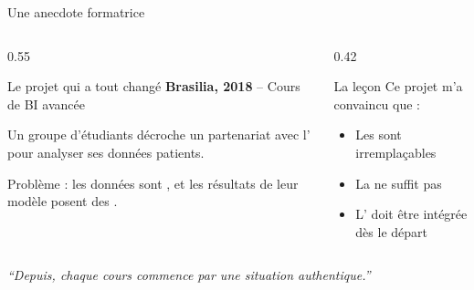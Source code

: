 \documentclass[aspectratio=169,11pt]{beamer}
\begin{document}
\begin{frame}{Une anecdote formatrice}
  \begin{columns}[T]
    \begin{column}{0.55\textwidth}
      \begin{block}{Le projet qui a tout changé}
        \textbf{Brasilia, 2018} -- Cours de BI avancée
        
        \vspace{0.5em}
        Un groupe d'étudiants décroche un partenariat avec l' pour analyser ses données patients.
        
        \vspace{0.5em}
        Problème : les données sont , et les résultats de leur modèle posent des .
      \end{block}
    \end{column}
    \begin{column}{0.42\textwidth}
      \begin{alertblock}{La leçon}
        Ce projet m'a convaincu que :
        \begin{itemize}
          \item Les  sont irremplaçables
          \item La  ne suffit pas
          \item L' doit être intégrée dès le départ
        \end{itemize}
      \end{alertblock}
    \end{column}
  \end{columns}
  
  \vspace{0.5em}
  \begin{center}
    \textit{``Depuis, chaque cours commence par une situation authentique.''}
  \end{center}
\end{frame}
\end{document}
